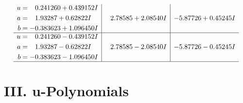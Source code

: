 \documentclass[1p]{elsarticle_modified}
\theoremstyle{definition}
\begin{document}
$$\begin{array}{c|c|c}
\begin{aligned}
u &= \phantom{-}0.241260 + 0.439152 I \\
a &= \phantom{-}1.93287 + 0.62822 I \\
b &= -0.383623 + 1.096450 I\end{aligned}
 & \phantom{-}2.78585 + 2.08540 I & -5.87726 + 0.45245 I \\ \hline\begin{aligned}
u &= \phantom{-}0.241260 - 0.439152 I \\
a &= \phantom{-}1.93287 - 0.62822 I \\
b &= -0.383623 - 1.096450 I\end{aligned}
 & \phantom{-}2.78585 - 2.08540 I & -5.87726 - 0.45245 I\\
 \hline 
 \end{array}$$\newpage
\newpage\renewcommand{\arraystretch}{1}
\centering \section*{ III. u-Polynomials}
\end{document}
